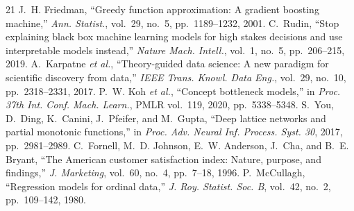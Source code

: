 \documentclass[10pt,twocolumn,letterpaper]{article}
\begin{document}
\begin{thebibliography}{21}
 J.~H. Friedman, ``Greedy function approximation: A gradient boosting machine,'' \textit{Ann. Statist.}, vol.~29, no.~5, pp.~1189--1232, 2001.
 C.~Rudin, ``Stop explaining black box machine learning models for high stakes decisions and use interpretable models instead,'' \textit{Nature Mach. Intell.}, vol.~1, no.~5, pp.~206--215, 2019.
 A.~Karpatne \textit{et al.}, ``Theory-guided data science: A new paradigm for scientific discovery from data,'' \textit{IEEE Trans. Knowl. Data Eng.}, vol.~29, no.~10, pp.~2318--2331, 2017.
 P.~W. Koh \textit{et al.}, ``Concept bottleneck models,'' in \textit{Proc. 37th Int. Conf. Mach. Learn.}, PMLR vol.~119, 2020, pp.~5338--5348.
 S.~You, D.~Ding, K.~Canini, J.~Pfeifer, and M.~Gupta, ``Deep lattice networks and partial monotonic functions,'' in \textit{Proc. Adv. Neural Inf. Process. Syst. 30}, 2017, pp.~2981--2989.
 C.~Fornell, M.~D. Johnson, E.~W. Anderson, J.~Cha, and B.~E. Bryant, ``The American customer satisfaction index: Nature, purpose, and findings,'' \textit{J. Marketing}, vol.~60, no.~4, pp.~7--18, 1996.
 P.~McCullagh, ``Regression models for ordinal data,'' \textit{J. Roy. Statist. Soc. B}, vol.~42, no.~2, pp.~109--142, 1980.
\end{thebibliography}
\end{document}
